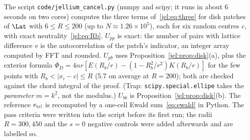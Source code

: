 The script \texttt{code/jellium\_cancel.py} (numpy and scipy; it runs in about 6 seconds on two cores) computes the
three terms of~\eqref{jel:eq:three} for disk patches of $\Lat$ with $6\le R\le200$ (up to $N\approx1.26\times10^5$),
each for six random centres $c$, with exact neutrality~\eqref{jel:eq:Rb}. $U_{pp}$ is exact: the number of pairs with
lattice difference $v$ is the autocorrelation of the patch's indicator, an integer array computed by FFT and rounded.
$U_{pb}$ uses Proposition~\ref{jel:prop:disk}(a), plus the exterior formula
$\Phi_D=4nr[E(R_b/r)-(1-R_b^2/r^2)K(R_b/r)]$ for the few points with $R_b<|x_i-c|\le R$ (5.7 on average at $R=200$);
both are checked against the chord integral of the proof. (Trap: \texttt{scipy.special.ellipe} takes the
\emph{parameter} $m=k^2$, not the modulus.) $U_{bb}$ is Proposition~\ref{jel:prop:disk}(b). The reference $e_{\rm tri}$
is recomputed by a one-cell Ewald sum~\eqref{eq:ewald} in Python. The pass criteria were written into the script before
its first run; the radii $R=300,450$ and the $s=0$ negative controls were added afterwards and are labelled so.

